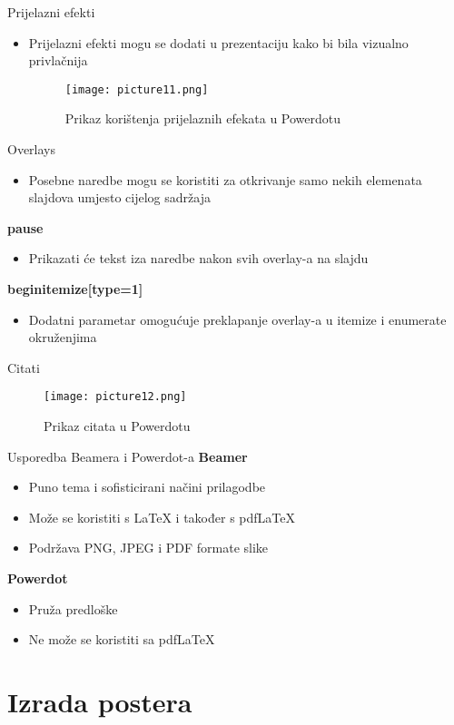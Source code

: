 \documentclass{beamer}
\begin{document}
 \begin{frame}{Prijelazni efekti}
 		\begin{itemize}
     			\item Prijelazni efekti mogu se dodati u prezentaciju kako bi bila vizualno privlačnija
 		\begin{figure}
 			\texttt{[image: picture11.png]}
 			\caption{Prikaz korištenja prijelaznih efekata u Powerdotu}
 		\end{figure}
 		\end{itemize}
 \end{frame}

 \begin{frame}{Overlays}
  		\begin{itemize}
     			\item Posebne naredbe mogu se koristiti za otkrivanje samo nekih elemenata slajdova umjesto cijelog sadržaja
 		\end{itemize}
 \textbf{pause}
 		\begin{itemize}
     			\item Prikazati će tekst iza naredbe nakon svih overlay-a na slajdu 
 		\end{itemize}
 \textbf{begin{itemize}[type=1]}
 		\begin{itemize}
     			\item Dodatni parametar omogućuje preklapanje overlay-a u itemize i enumerate okruženjima
 		\end{itemize}
 \end{frame}

 \begin{frame}{Citati}
 		\begin{figure}
 			\texttt{[image: picture12.png]}
 			\caption{Prikaz citata u Powerdotu}
 		\end{figure}   
 \end{frame}

 \begin{frame}{Usporedba Beamera i Powerdot-a}
 \textbf{Beamer}
 		\begin{itemize}
     			\item Puno tema i sofisticirani načini prilagodbe
     			\item Može se koristiti s LaTeX i također s pdfLaTeX
     			\item Podržava PNG, JPEG i PDF formate slike
 		\end{itemize}
 \textbf{Powerdot}
 		\begin{itemize}
     			\item Pruža predloške
     			\item Ne može se koristiti sa pdfLaTeX
 		\end{itemize}
\end{frame}

\section{Izrada postera}
\end{document}
